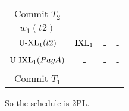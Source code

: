 \begin{table}[H]
\begin{tabular}{c|ccc|}
    Commit $T_2$                 &                                         &                      &                       \\
    $w_1(t2)$                    &                                         &                      &                       \\
    $\textnormal{U-XL}_1(t2)$    & $\textnormal{IXL}_1$                    & -                    & -                     \\
    $\textnormal{U-IXL}_1(PagA)$ & -                                       & -                    & -                     \\
    Commit $T_1$                 & \multicolumn{1}{l}{}                    & \multicolumn{1}{l}{} & \multicolumn{1}{l|}{} \\ \cline{2-4} 
    \end{tabular}
\end{table}
So the schedule is 2PL.